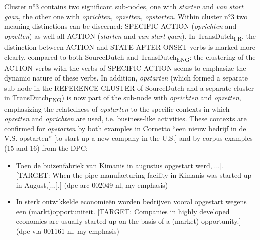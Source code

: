 Cluster n°3 contains two significant sub-nodes, one with \textit{starten} and \textit{van} \textit{start} \textit{gaan}, the other one with \textit{oprichten,} \textit{opzetten,} \textit{opstarten}. Within cluster n°3 two meaning distinctions can be discerned: {SPECIFIC} ACTION (\textit{oprichten} and \textit{opzetten}) as well all ACTION (\textit{starten} and \textit{van} \textit{start} \textit{gaan}). In TransDutch\textsubscript{FR}, the distinction between ACTION and STATE AFTER ONSET verbs is marked more clearly, compared to both SourceDutch and TransDutch\textsubscript{ENG}: the clustering of the ACTION verbs with the verbs of {SPECIFIC} ACTION seems to emphasize the dynamic nature of these verbs. In addition, \textit{opstarten} (which formed a separate sub-node in the REFERENCE CLUSTER of SourceDutch and a separate cluster in TransDutch\textsubscript{ENG}) is now part of the sub-node with \textit{oprichten} and \textit{opzetten}, emphasizing the relatedness of \textit{opstarten} to the specific contexts in which \textit{opzetten} and \textit{oprichten} are used, i.e. business-like activities. These contexts are confirmed for \textit{opstarten} by both examples in Cornetto “een nieuw bedrijf in de V.S. opstarten” [to start up a new company in the U.S.] and by corpus examples (15 and 16) from the DPC:

\begin{itemize}
\item \begin{styleVoorbeeld}
Toen de buizenfabriek van Kimanis in augustus opgestart werd,[...]. [TARGET: When the pipe manufacturing facility in Kimanis was started up in August,[...].] (dpc-arc-002049-nl, my emphasis)
\end{styleVoorbeeld}
\item \begin{styleVoorbeeld}
In sterk ontwikkelde economieën worden bedrijven vooral opgestart wegens een (markt)opportuniteit. [TARGET: Companies in highly developed economies are usually started up on the basis of a (market) opportunity.] (dpc-vla-001161-nl, my emphasis)
\end{styleVoorbeeld}
\end{itemize}


